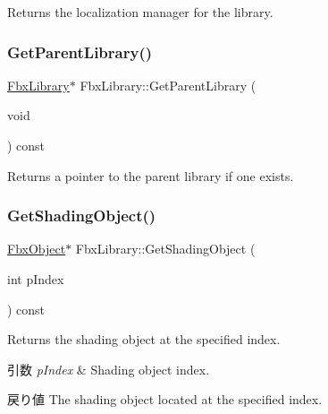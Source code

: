 Returns the localization manager for the library. \mbox{\label{class_fbx_library_a8733a34df39aefd786bd792ee646d3ca}} 
\subsubsection{\texorpdfstring{Get\+Parent\+Library()}{GetParentLibrary()}}
{\footnotesize\ttfamily \hyperlink{class_fbx_library}{Fbx\+Library}$\ast$ Fbx\+Library\+::\+Get\+Parent\+Library (\begin{DoxyParamCaption}\item[{void}]{ }\end{DoxyParamCaption}) const}



Returns a pointer to the parent library if one exists. 

\mbox{\label{class_fbx_library_ae7783de818ed0eca3fa34ff6378685fb}} 
\subsubsection{\texorpdfstring{Get\+Shading\+Object()}{GetShadingObject()}\hspace{0.1cm}{\footnotesize\ttfamily [1/2]}}
{\footnotesize\ttfamily \hyperlink{class_fbx_object}{Fbx\+Object}$\ast$ Fbx\+Library\+::\+Get\+Shading\+Object (\begin{DoxyParamCaption}\item[{int}]{p\+Index }\end{DoxyParamCaption}) const}

Returns the shading object at the specified index. 
\begin{DoxyParams}{引数}
{\em p\+Index} & Shading object index. \\
\hline
\end{DoxyParams}
\begin{DoxyReturn}{戻り値}
The shading object located at the specified index. 
\end{DoxyReturn}
\mbox{\label{class_fbx_library_a1eb2147612d1073d6afbf562adfe3c25}} 
